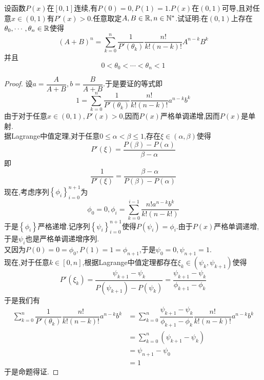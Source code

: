 \documentclass{ctexart}
\begin{document}
\begin{problem}[9.(15\songti{分})]
    设函数$P(x)$在$[0,1]$连续,有$P(0)=0,P(1)=1$.$P(x)$在$(0,1)$可导,且对任意$x\in(0,1)$有$P'(x)>0$.任意取定$A,B\in\mathbb{R},n\in\mathbb{N}^*$.试证明:在$(0,1)$上存在$\theta_0,\cdots,\theta_n\in\mathbb{R}$使得
    \[(A+B)^n=\sum_{k=0}^n\dfrac{1}{P'(\theta_k)}\dfrac{n!}{k!(n-k)!}A^{n-k}B^k\]
    并且\[0<\theta_0<\cdots<\theta_n<1\]
\end{problem}
\begin{proof}
    设$a=\dfrac{A}{A+B},b=\dfrac{B}{A+B}$.于是要证的等式即
    \[1=\sum_{k=0}^n\dfrac{1}{P'(\theta_k)}\dfrac{n!}{k!(n-k)!}a^{n-k}b^k\]
    由于对于任意$x\in(0,1),P'(x)>0$,因而$P(x)$严格单调递增,因而$P(x)$是单射.\\
    据Lagrange中值定理,对于任意$0\leqslant\alpha<\beta\leqslant1$,存在$\xi\in(\alpha,\beta)$使得
    \[P'(\xi)=\dfrac{P(\beta)-P(\alpha)}{\beta-\alpha}\]
    即\[\dfrac{1}{P'(\xi)}=\dfrac{\beta-\alpha}{P(\beta)-P(\alpha)}\]
    现在,考虑序列$\left\{\phi_i\right\}_{i=0}^{n+1}$为
    \[\phi_{0}=0,\phi_{i}=\sum_{k=0}^{i-1}\dfrac{n!a^{n-k}b^k}{k!(n-k!)}\]
    于是$\left\{\phi_i\right\}$严格递增.记序列$\left\{\psi_i\right\}_{i=0}^{n+1}$使得$P(\psi_i)=\phi_i$.由于$P(x)$严格单调递增,于是$\psi_i$也是严格单调递增序列.\\
    又因为$P(0)=0=\phi_0,P(1)=1=\phi_{n+1}$,于是$\psi_0=0,\psi_{n+1}=1$.\\
    现在,对于任意$k\in[0,n]$,根据Lagrange中值定理都存在$\xi_k\in(\psi_k,\psi_{k+1})$使得
    \[P'(\xi_k)=\dfrac{\psi_{k+1}-\psi_k}{P(\psi_{k+1})-P(\psi_k)}=\dfrac{\psi_{k+1}-\psi_k}{\phi_{k+1}-\phi_k}\]
    于是我们有
    \[\begin{aligned}
        \sum_{k=0}^n\dfrac{1}{P'(\theta_k)}\dfrac{n!}{k!(n-k)!}a^{n-k}b^k
        &= \sum_{k=0}^n\dfrac{\psi_{k+1}-\psi_k}{\phi_{k+1}-\phi_k}\dfrac{n!}{k!(n-k)!}a^{n-k}b^k \\
        &= \sum_{k=0}^n\left(\psi_{k+1}-\psi_k\right) \\
        &= \psi_{n+1}-\psi_0 \\
        &= 1
    \end{aligned}\]
    于是命题得证.
\end{proof}
\end{document}
